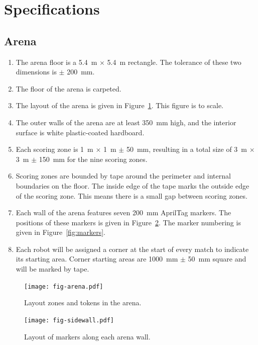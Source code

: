 \section{Specifications}
\label{sec:specs}

\subsection{Arena}
\label{spec:arena}

\begin{enumerate}
  \item The arena floor is a \SI{5.4}{m} $\times$ \SI{5.4}{m} rectangle. The
        tolerance of these two dimensions is $\pm$ \SI{200}{mm}.
  \item The floor of the arena is carpeted.
  \item The layout of the arena is given in Figure~\ref{fig:arena}. This
        figure is to scale.
  \item The outer walls of the arena are at least \SI{350}{mm} high, and the
        interior surface is white plastic-coated hardboard.
  \item Each scoring zone is \SI{1}{m} $\times$ \SI{1}{m} $\pm$ \SI{50}{mm},
        resulting in a total size of \SI{3}{m} $\times$ \SI{3}{m} $\pm$ \SI{150}{mm}
        for the nine scoring zones.
  \item Scoring zones are bounded by tape around the perimeter
        and internal boundaries on the floor. The inside edge of the tape marks the outside
        edge of the scoring zone. This means there is a small gap between scoring zones.
  \item Each wall of the arena features seven \SI{200}{mm} AprilTag markers.
        The positions of these markers is given in Figure~\ref{fig:sidewall}.
        The marker numbering is given in Figure~\ref{fig:markers}.
  \item Each robot will be assigned a corner at the start of every match to indicate its starting area.
        Corner starting areas are \SI{1000}{mm} $\pm$ \SI{50}{mm} square and will be marked by tape.
\end{enumerate}

\begin{figure}
  \centering
  \texttt{[image: fig-arena.pdf]}
  \caption{Layout zones and tokens in the arena.}
  \label{fig:arena}
\end{figure}


\begin{figure}
  \centering
  \texttt{[image: fig-sidewall.pdf]}
  \caption{Layout of markers along each arena wall.}
  \label{fig:sidewall}
\end{figure}


